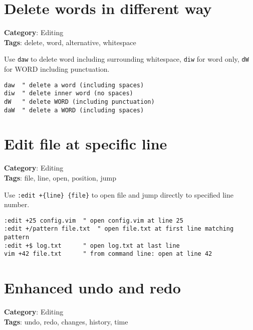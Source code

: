 {{{\section{Delete words in different way}

\textbf{Category}: Editing\\ \textbf{Tags}: delete, word, alternative, whitespace
\vspace{0.5cm}

Use {\footnotesize \Verb§daw§} to delete word including surrounding whitespace, {\footnotesize \Verb§diw§} for word only, {\footnotesize \Verb§dW§} for WORD including punctuation.

\begin{Exa*}{}
\begin{Verbatim}[fontsize=\footnotesize, breaklines, breakanywhere]
daw  " delete a word (including spaces)
diw  " delete inner word (no spaces)
dW   " delete WORD (including punctuation)
daW  " delete a WORD (including spaces)
\end{Verbatim}
\end{Exa*}

\section{Edit file at specific line}

\textbf{Category}: Editing\\ \textbf{Tags}: file, line, open, position, jump
\vspace{0.5cm}

Use {\footnotesize \Verb§:edit +{line} {file}§} to open file and jump directly to specified line number.

\begin{Exa*}{}
\begin{Verbatim}[fontsize=\footnotesize, breaklines, breakanywhere]
:edit +25 config.vim  " open config.vim at line 25
:edit +/pattern file.txt  " open file.txt at first line matching pattern
:edit +$ log.txt      " open log.txt at last line
vim +42 file.txt      " from command line: open at line 42
\end{Verbatim}
\end{Exa*}

\section{Enhanced undo and redo}

\textbf{Category}: Editing\\ \textbf{Tags}: undo, redo, changes, history, time
\vspace{0.5cm}

}}}
